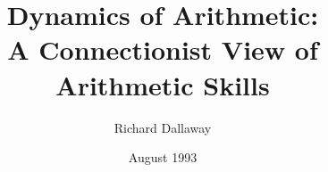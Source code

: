 
\title{Dynamics of Arithmetic:\\A Connectionist View of Arithmetic Skills}
\author{Richard Dallaway}
\date{August 1993}
